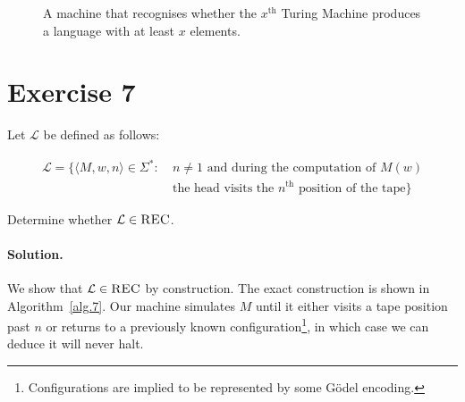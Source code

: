 \documentclass[11pt]{llncs}
\begin{document}
\begin{figure}[t]
\begin{algorithm}[H]
  \caption{\label{alg.6}
      A machine that recognises whether the $x^{\text{th}}$ Turing Machine
      produces a language with at least $x$ elements.
  }
  \begin{algorithmic}[1]
                          \State{}
                      \EndIf
                  \EndIf
              \EndFor
          \EndWhile
      \EndFunction
  \end{algorithmic}
\end{algorithm}
\end{figure}

\section*{Exercise 7}

Let $\mathcal{L}$ be defined as follows:

\begin{align*}
\mathcal{L} = \{\langle M, w, n \rangle \in \Sigma^*:\ &n \neq 1
                \text{ and during the computation of } M(w)\\
                &\text{the head visits the } n^{\text{th}}
                \text{ position of the tape}\}
\end{align*}

Determine whether $\mathcal{L} \in \textsc{REC}$.

\paragraph{Solution.}

We show that $\mathcal{L} \in \textsc{REC}$ by construction. The exact
construction is shown in Algorithm~\ref{alg.7}. Our machine simulates $M$ until
it either visits a tape position past $n$ or returns to a previously known
configuration\footnote{Configurations are implied to be represented by some
G\"odel encoding.}, in which case we can deduce it will never halt.
\end{document}
